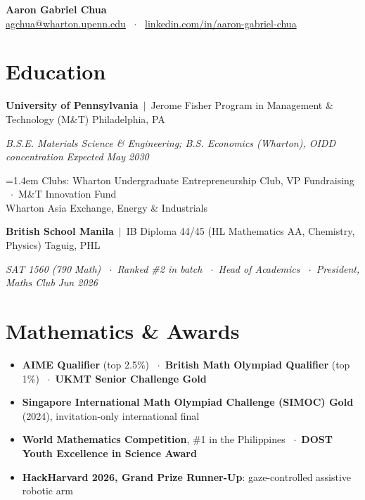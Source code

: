 \documentclass[10pt,letterpaper]{article}
\newcommand{\sep}{\unskip\ $\cdot$\ \ignorespaces}
\begin{document}
\begin{center}
  {\LARGE\bfseries Aaron Gabriel Chua}\\[3pt]
  {\small
   \href{mailto:agchua@wharton.upenn.edu}{agchua@wharton.upenn.edu} \sep
   \href{https://www.linkedin.com/in/aaron-gabriel-chua/}{linkedin.com/in/aaron-gabriel-chua}}
\end{center}
\vspace{-6pt}

\section*{Education}
\textbf{University of Pennsylvania} \,$|$\, Jerome Fisher Program in Management \& Technology (M\&T) \hfill Philadelphia, PA\par
\textit{B.S.E. Materials Science \& Engineering; B.S. Economics (Wharton), OIDD concentration} \hfill \textit{Expected May 2030}\par
\hangindent=1.4em
Clubs: Wharton Undergraduate Entrepreneurship Club, VP Fundraising \sep M\&T Innovation Fund\\
Wharton Asia Exchange, Energy \& Industrials\par
\vspace{4pt}
\textbf{British School Manila} \,$|$\, IB Diploma 44/45 (HL Mathematics AA, Chemistry, Physics) \hfill Taguig, PHL\par
\textit{SAT 1560 (790 Math) \sep Ranked \#2 in batch \sep Head of Academics \sep President, Maths Club} \hfill \textit{Jun 2026}\par

\section*{Mathematics \& Awards}
\begin{itemize}
  \item \textbf{AIME Qualifier} (top 2.5\%) \sep \textbf{British Math Olympiad Qualifier} (top 1\%) \sep \textbf{UKMT Senior Challenge Gold}
  \item \textbf{Singapore International Math Olympiad Challenge (SIMOC) Gold} (2024), invitation-only international final
  \item \textbf{World Mathematics Competition}, \#1 in the Philippines \sep \textbf{DOST Youth Excellence in Science Award}
  \item \textbf{HackHarvard 2026, Grand Prize Runner-Up}: gaze-controlled assistive robotic arm
\end{itemize}
\end{document}
